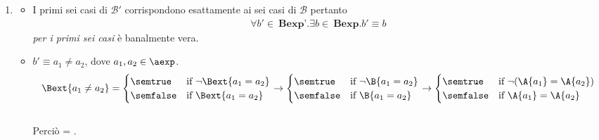 {\begin{enumerate}[label=(\alph*)]
   =
  \caseFun{\semtrue}
          { < }
          {\semfalse}
          { \not < } \\ \\

   =
  \caseFun{\semtrue}
          { \geq {}}
          {\semfalse}
          { \not \geq {}} \\ \\

   = 
  \caseFun{\semtrue}
          { = \semfalse \ \mbox{ or } \
             = \semtrue}
          {\semfalse}
          { = \semtrue \ \mbox{ and } \ 
             = \semfalse} \\ \\

   =
  \caseFun{\semtrue}
          { = \Bext{b_2}}
          {\semfalse}
          {\Bext{b_1} \neq {}} \\ \\

\item
  \begin{itemize}
    \item I primi sei casi di $\mathcal{B'}$ corrispondono esattamente ai sei 
casi di $\mathcal{B}$ pertanto 
      \begin{align*}
        \forall b' \in \ \textbf{Bexp'}.\exists b \in 
        \ \textbf{Bexp}.b' \equiv b
      \end{align*}
      \textit{per i primi sei casi} è banalmente vera.

    \item $b' \equiv a_1 \neq a_2$, dove $a_1, a_2 \in \aexp$. \\ 
      \begin{align*}
        \Bext{a_1 \neq a_2} = 
        \begin{cases} 
          \semtrue & 
          \mbox{if} \ \lnot \Bext{a_1 = a_2} \\ 
          \semfalse & 
          \mbox{if}  \ \Bext{a_1 = a_2}\\
        \end{cases}
        \rightarrow
        \begin{cases} 
          \semtrue & 
          \mbox{if} \ \lnot \B{a_1 = a_2} \\ 
          \semfalse & 
          \mbox{if}  \ \B{a_1 = a_2}\\
        \end{cases}
        \rightarrow
        \begin{cases} 
          \semtrue & 
          \mbox{if} \ \lnot (\A{a_1} = \A{a_2}) \\ 
          \semfalse & 
          \mbox{if}  \ \A{a_1} = \A{a_2}\\
        \end{cases} 
      \end{align*} \\
      Perciò  = . \\


\end{itemize}
\end{enumerate}}
